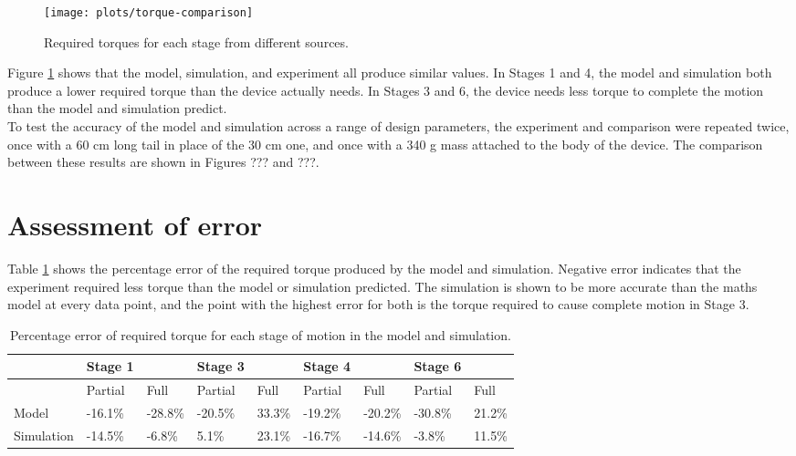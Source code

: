 \begin{figure}[!h]
	\centering
	\texttt{[image: plots/torque-comparison]}
	\caption{Required torques for each stage from different sources.}
	\label{fig:torque-comparison}
\end{figure}

Figure \ref{fig:torque-comparison} shows that the model, simulation, and experiment all produce similar values. In Stages 1 and 4, the model and simulation both produce a lower required torque than the device actually needs. In Stages 3 and 6, the device needs less torque to complete the motion than the model and simulation predict.\\
To test the accuracy of the model and simulation across a range of design parameters, the experiment and comparison were repeated twice, once with a 60 cm long tail in place of the 30 cm one, and once with a 340 g mass attached to the body of the device. The comparison between these results are shown in Figures ??? and ???.  
\\
 
\section{Assessment of error}

Table \ref{tab:error} shows the percentage error of the required torque produced by the model and simulation. Negative error indicates that the experiment required less torque than the model or simulation predicted. The simulation is shown to be more accurate than the maths model at every data point, and the point with the highest error for both is the torque required to cause complete motion in Stage 3.\\
 

\begin{table}[!ht]
	\centering
	\caption{Percentage error of required torque for each stage of motion in the model and simulation.}
	\label{tab:error}
	\begin{tabular}{|l|l|l|l|l|l|l|l|l|}
		\hline
		~ & Stage 1 & ~ & Stage 3 & ~ & Stage 4 & ~ & Stage 6 & ~ \\ \hline
		~ & Partial & Full & Partial & Full & Partial & Full & Partial & Full \\ \hline
		Model & -16.1\% & -28.8\% & -20.5\% & 33.3\% & -19.2\% & -20.2\% & -30.8\% & 21.2\% \\ \hline
		Simulation & -14.5\% & -6.8\% & 5.1\% & 23.1\% & -16.7\% & -14.6\% & -3.8\% & 11.5\% \\ \hline
	\end{tabular}
\end{table}

